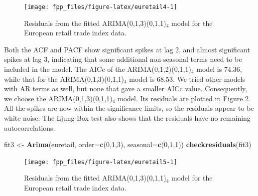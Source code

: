 \documentclass[]{book}
\newenvironment{Shaded}{\begin{snugshade}}{\end{snugshade}}
\newcommand{\DataTypeTok}[1]{\textcolor[rgb]{0.13,0.29,0.53}{#1}}
\newcommand{\DecValTok}[1]{\textcolor[rgb]{0.00,0.00,0.81}{#1}}
\newcommand{\KeywordTok}[1]{\textcolor[rgb]{0.13,0.29,0.53}{\textbf{#1}}}
\newcommand{\NormalTok}[1]{#1}
\newcommand{\OperatorTok}[1]{\textcolor[rgb]{0.81,0.36,0.00}{\textbf{#1}}}
\newcommand{\StringTok}[1]{\textcolor[rgb]{0.31,0.60,0.02}{#1}}
\begin{document}
\begin{Shaded}
\end{Shaded}

\begin{figure}

{\centering \texttt{[image: fpp\_files/figure-latex/euretail4-1]} 

}

\caption{Residuals from the fitted ARIMA(0,1,3)(0,1,1)$_4$ model for the European retail trade index data.}\label{fig:euretail4}
\end{figure}

Both the ACF and PACF show significant spikes at lag 2, and almost significant spikes at lag 3, indicating that some additional non-seasonal terms need to be included in the model. The AICc of the ARIMA(0,1,2)(0,1,1)\(_4\) model is 74.36, while that for the ARIMA(0,1,3)(0,1,1)\(_4\) model is 68.53. We tried other models with AR terms as well, but none that gave a smaller AICc value. Consequently, we choose the ARIMA(0,1,3)(0,1,1)\(_4\) model. Its residuals are plotted in Figure \ref{fig:euretail5}. All the spikes are now within the significance limits, so the residuals appear to be white noise. The Ljung-Box test also shows that the residuals have no remaining autocorrelations.

\begin{Shaded}
\begin{Highlighting}[]
\NormalTok{fit3 <-}\StringTok{ }\KeywordTok{Arima}\NormalTok{(euretail, }\DataTypeTok{order=}\KeywordTok{c}\NormalTok{(}\DecValTok{0}\NormalTok{,}\DecValTok{1}\NormalTok{,}\DecValTok{3}\NormalTok{), }\DataTypeTok{seasonal=}\KeywordTok{c}\NormalTok{(}\DecValTok{0}\NormalTok{,}\DecValTok{1}\NormalTok{,}\DecValTok{1}\NormalTok{))}
\KeywordTok{checkresiduals}\NormalTok{(fit3)}
\end{Highlighting}
\end{Shaded}

\begin{figure}

{\centering \texttt{[image: fpp\_files/figure-latex/euretail5-1]} 

}

\caption{Residuals from the fitted ARIMA(0,1,3)(0,1,1)$_4$ model for the European retail trade index data.}\label{fig:euretail5}
\end{figure}
\end{document}
